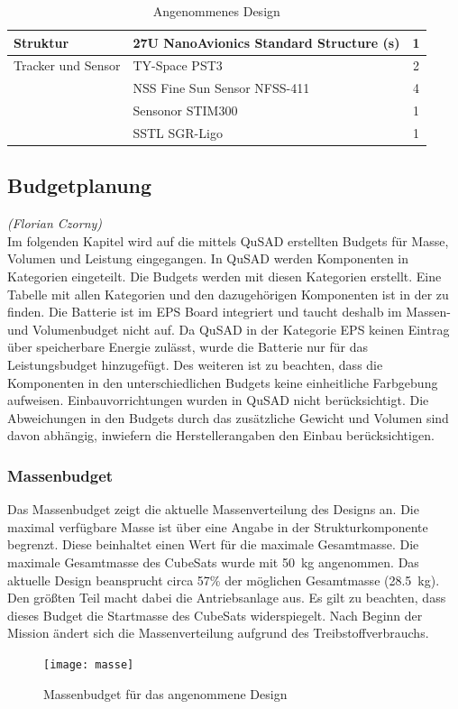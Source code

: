 \begin{table}[H]
\begin{tabular}{|l|l|c|}
Struktur                        & 27U NanoAvionics Standard Structure (s)       & 1      \\ \hline
Tracker und Sensor               & TY-Space PST3                                 & 2      \\ \hline
                                & NSS Fine Sun Sensor NFSS-411                  & 4      \\ \hline
                                & Sensonor STIM300                              & 1      \\ \hline
                                & SSTL SGR-Ligo                                 & 1      \\ \hline
\end{tabular}
\caption{Angenommenes Design \cite{Lettau.}}
\label{tab:cubesatdesign}
\end{table}
	
				\subsection{Budgetplanung}
				\hfill\emph{(Florian Czorny)}\\
Im folgenden Kapitel wird auf die mittels QuSAD erstellten Budgets für Masse, Volumen und Leistung eingegangen. In QuSAD werden Komponenten in Kategorien eingeteilt. Die Budgets werden mit diesen Kategorien erstellt. Eine Tabelle mit allen Kategorien und den dazugehörigen Komponenten ist in der  zu finden. Die Batterie ist im EPS Board integriert und taucht deshalb im Massen- und Volumenbudget nicht auf. Da QuSAD in der Kategorie EPS keinen Eintrag über speicherbare Energie zulässt, wurde die Batterie nur für das Leistungsbudget hinzugefügt. Des weiteren ist zu beachten, dass die Komponenten in den unterschiedlichen Budgets keine einheitliche Farbgebung aufweisen. Einbauvorrichtungen wurden in QuSAD nicht berücksichtigt. Die Abweichungen in den Budgets durch das  zusätzliche Gewicht und Volumen sind davon abhängig, inwiefern die Herstellerangaben den Einbau berücksichtigen.

						\subsubsection{Massenbudget}
Das Massenbudget  zeigt die aktuelle Massenverteilung des Designs an. Die maximal verfügbare Masse ist über eine Angabe in der Strukturkomponente begrenzt. Diese beinhaltet einen Wert für die maximale Gesamtmasse. Die maximale Gesamtmasse des CubeSats wurde mit \SI{50}{\kilogram} angenommen. Das aktuelle Design beansprucht circa \num{57}\% der möglichen Gesamtmasse (\SI{28,5}{\kilogram}). Den größten Teil macht dabei die Antriebsanlage aus. Es gilt zu beachten, dass dieses Budget die Startmasse des CubeSats widerspiegelt. Nach Beginn der Mission ändert sich die Massenverteilung aufgrund des Treibstoffverbrauchs.
										\begin{figure}[H]
											\centering
												\texttt{[image: masse]}
											\caption{Massenbudget für das angenommene Design}
											\label{fig:masse}
										\end{figure}
								
